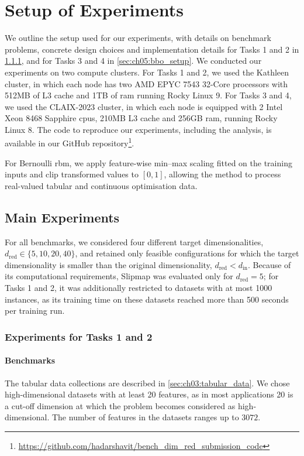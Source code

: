 \section{Setup of Experiments}
\label{sec:ch05:exp_setup}
We outline the setup used for our experiments, with details on benchmark problems, concrete design choices and implementation details for Tasks 1 and 2 in \cref{sec:ch05:ml_setup}, and for Tasks 3 and 4 in \cref{sec:ch05:bbo_setup}.
We conducted our experiments on two compute clusters.
For Tasks 1 and 2, we used the Kathleen cluster, in which each node has two AMD EPYC 7543 32-Core processors with 512MB of L3 cache and 1TB of \gls{ram} running Rocky Linux 9.
For Tasks 3 and 4, we used the CLAIX-2023 cluster, in which each node is equipped with 2 Intel Xeon 8468 Sapphire \glspl{cpu}, 210MB L3 cache and 256GB \gls{ram}, running Rocky Linux 8.
The code to reproduce our experiments, including the analysis, is available in our GitHub repository\footnote{\url{https://github.com/hadarshavit/bench_dim_red_submission_code}}.

For Bernoulli \gls{rbm}, we apply feature-wise min--max scaling fitted on the training inputs and clip transformed values to $[0,1]$, allowing the method to process real-valued tabular and continuous optimisation data.

\subsection{Main Experiments}

For all benchmarks, we considered four different target dimensionalities, $d_{\mathrm{red}} \in \{5,10,20,40\}$, and retained only feasible configurations for which the target dimensionality is smaller than the original dimensionality, $d_{\mathrm{red}} < d_{\mathrm{in}}$.
Because of its computational requirements, Slipmap was evaluated only for $d_{\mathrm{red}}=5$; for Tasks 1 and 2, it was additionally restricted to datasets with at most 1000 instances, as its training time on these datasets reached more than 500 seconds per training run.

\subsubsection{Experiments for Tasks 1 and 2}
\label{sec:ch05:ml_setup}

\paragraph*{Benchmarks}
The tabular data collections are described in \cref{sec:ch03:tabular_data}.
We chose     high-dimensional datasets with at least 20 features, as in most applications 20 is a cut-off dimension at which the problem becomes considered as high-dimensional. The number of features in the datasets ranges up to $3072$.

